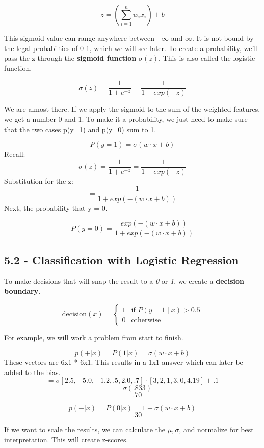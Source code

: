 \documentclass{article}
\begin{document}
\[
    z = (\sum_{i=1}^{n} w_i x_i) + b
\]

This sigmoid value can range anywhere between - $\infty$  and  $\infty$. It is not bound by the legal probabilties of 0-1, which we will see later. \newline
To create a probability, we'll pass the z through the \textbf{sigmoid function} $\sigma(z)$. This is also called the logistic function.


\[
    \sigma(z) = \frac{1}{1 + e^{-z}} = \frac{1} {1 + exp(-z)}
\]

We are almost there. If we apply the sigmoid to the sum of the weighted features, we get a number 0 and 1.
To make it a probability, we just need to make sure that the two cases p(y=1) and p(y=0) sum to 1.

\[
    P(y = 1) = \sigma (w \cdot x + b)
\]
Recall:
\[
    \sigma(z) = \frac{1}{1 + e^{-z}} = \frac{1} {1 + exp(-z)}
\]
Substitution for the z:
\[
    = \frac{1}{1 + exp(-(w \cdot x +b))}
\]
Next, the probability that y = 0.

\[
    P(y=0) = \frac {exp (-(w \cdot x + b))} {1 + exp(-(w \cdot x + b))}
\]

\subsection{ 5.2 - Classification with Logistic Regression}

To make decisions that will snap the result to a \textit{0} or \textit{1}, we create a \textbf{decision boundary}.

\[
    \text{decision}(x) =
    \begin{cases}
        1 & \text{if } P(y = 1 \mid x) > 0.5 \\
        0 & \text{otherwise}
    \end{cases}
\]

For example, we will work a problem from start to finish.

\[
    p(+|x) =  P(1|x) = \sigma (w \cdot x + b)
\]
These vectors are 6x1 * 6x1. This results in a 1x1 answer which can later be added to the bias.
\[
    = \sigma [2.5,-5.0, -1.2, .5, 2.0, .7] \cdot [3,2,1,3,0,4.19] + .1
\]
\[
    = \sigma(.833)
\]
\[
    = .70
\]

\[
    p(-|x) =  P(0|x) = 1 - \sigma (w \cdot x + b)
\]
\[
    = .30
\]

If we want to scale the results, we can calculate the $\mu, \sigma$, and normalize for best interpretation. This will create z-scores.
\end{document}
